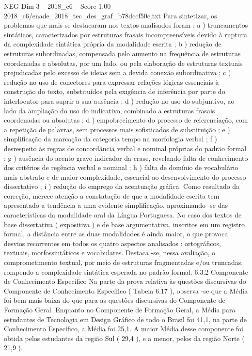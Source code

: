 \begin{textsample}{NEG Dim 3 – 2018\_c6 – Score 1.00 – 2018\_c6/enade\_2018\_tec\_des\_graf\_b78dccf50c.txt}
Para sintetizar, os problemas que mais se destacaram nos textos analisados foram : a ) truncamentos sintáticos, caracterizados por estruturas frasais incompreensíveis devido à ruptura da complexidade sintática própria da modalidade escrita ; b ) redução de estruturas subordinadas, compensada pelo aumento na frequência de estruturas coordenadas e absolutas, por um lado, ou pela elaboração de estruturas textuais prejudicadas pelo excesso de ideias sem a devida conexão subordinativa ; c ) redução no uso de conectores para expressar relações lógicas essenciais à construção do texto, substituídos pela exigência de inferência por parte do interlocutor para suprir a sua ausência ; d ) redução no uso do subjuntivo, ao lado da ampliação do uso do indicativo, combinado a estruturas frasais coordenadas ou absolutas ; d ) empobrecimento do processo de referenciação, com a repetição de palavras, sem processos mais sofisticados de substituição ; e ) simplificação da marcação da categoria tempo na morfologia verbal ; f ) desrespeito às regras de concordância verbal e nominal próprias do padrão formal ; g ) ausência do acento grave indicador da crase, revelando falta de conhecimento dos critérios de regência verbal e nominal ; h ) falta de domínio de vocabulário mais abstrato e de maior complexidade, essencial ao desenvolvimento do processo dissertativo ; i ) redução do emprego da acentuação gráfica.
Como resultado da correção, merece atenção a constatação de que a modalidade escrita tem apresentado a tendência a uma evidente simplificação, aproximando -se das características da modalidade oral da Língua Portuguesa.
No caso dos textos de base dissertativa ( expositiva ) e de base argumentativa, inscritos em um registro formal, a distância entre as duas modalidades é ainda maior, o que provoca desvios recorrentes em todos os quatro aspectos analisados : ortográficos, textuais, morfossintáticos e vocabulares.
Destaca -se, nessa avaliação, o comprometimento textual, por meio de estruturas fragmentadas e/ou truncadas, rompendo a complexidade sintática esperada no padrão formal. 6.3.2 Componente de Conhecimento Específico Na parte da prova relativa às questões discursivas do Componente de Conhecimento Específico ( Tabela 6.17 ), observa -se que a Média foi bem mais baixa do que para as questões discursivas do Componente de Formação Geral.
Enquanto no Componente de Formação Geral, a Média para estudantes de Tecnologia em Design Gráfico de todo o Brasil foi 41,1, na parte de Conhecimento Específico, a Média foi 25,1.
A maior Média desse componente foi obtida pelos estudantes da região Sul ( 29,4 ), e a menor, pelos da região Norte ( 21,9 ).

\end{textsample}
